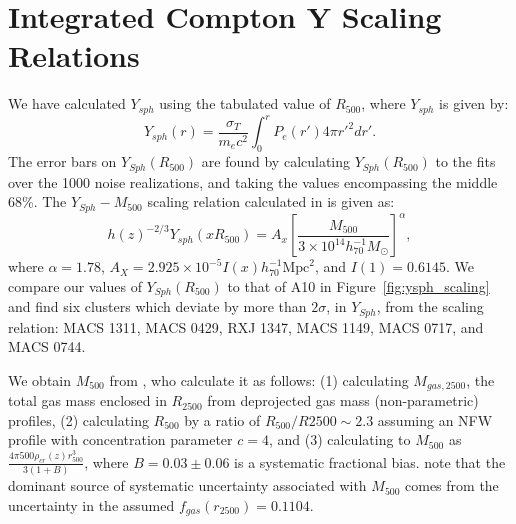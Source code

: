 \documentclass[iop,numberedappendix,apj]{emulateapj}
\begin{document}


\section{Integrated Compton Y Scaling Relations}


We have calculated $Y_{sph}$ using the tabulated value of $R_{500}$, where $Y_{sph}$ is given by:
\begin{equation}
  Y_{sph}(r) = \frac{\sigma_T}{m_e c^2} \int_0^r P_e(r') 4 \pi r'^2 dr' .
  \label{eqn:ysph}
\end{equation}
The error bars on $Y_{Sph}(R_{500})$ are found by calculating $Y_{Sph}(R_{500})$ to the fits over the 1000 noise realizations, and
taking the values encompassing the middle 68\%.
The $Y_{Sph} - M_{500}$ scaling relation calculated in \citet{arnaud2010} is given as:
\begin{equation}
  h(z)^{-2/3} Y_{sph}(x R_{500}) = A_x \left[ \frac{M_{500}}{3 \times 10^{14} h_{70}^{-1} M_{\odot}} \right] ^{\alpha} ,
  \label{eqn:ysph_scaling}
\end{equation}
where $\alpha = 1.78$, $A_X = 2.925 \times 10^{-5} I(x) h_{70}^{-1}\text{Mpc}^2$, and $I(1) = 0.6145$.
We compare our values of $Y_{Sph}(R_{500})$ to that of A10 in Figure~\ref{fig:ysph_scaling}
and find six clusters which deviate by more than $2 \sigma$, in $Y_{Sph}$, from the scaling relation: 
MACS 1311, MACS 0429, RXJ 1347, MACS 1149, MACS 0717, and MACS 0744.

We obtain $M_{500}$ from \citet{mantz2010}, who calculate it as follows: (1) calculating $M_{gas,2500}$, the total gas mass enclosed in
$R_{2500}$ from deprojected gas mass (non-parametric) profiles, (2) calculating $R_{500}$ by a ratio of $R_{500} / R{2500} \sim 2.3$
assuming an NFW profile with concentration parameter $c=4$, and (3) calculating to $M_{500}$ as 
$\frac{4 \pi 500 \rho_{cr}(z) r_{500}^3}{3(1+B)}$, where $B = 0.03 \pm 0.06$ is a systematic fractional bias. 
\citet{mantz2010} note that the dominant source of systematic uncertainty associated with $M_{500}$ comes from the uncertainty 
in the assumed $f_{gas}(r_{2500}) = 0.1104$. 
\end{document}
